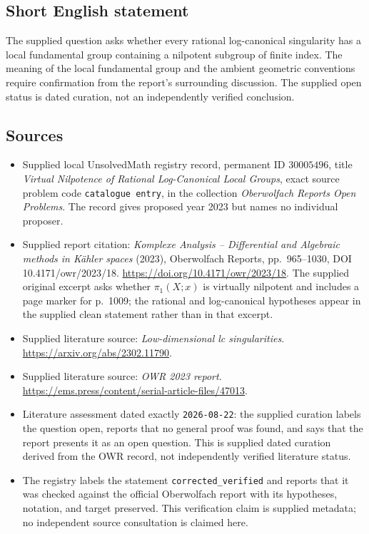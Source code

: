 \documentclass[11pt]{article}
\begin{document}
\subsection{Short English statement}
The supplied question asks whether every rational log-canonical singularity has a local fundamental group containing a nilpotent subgroup of finite index. The meaning of the local fundamental group and the ambient geometric conventions require confirmation from the report's surrounding discussion. The supplied open status is dated curation, not an independently verified conclusion.
\subsection{Sources}
\begin{itemize}
\item Supplied local UnsolvedMath registry record, permanent ID \(30005496\), title \emph{Virtual Nilpotence of Rational Log-Canonical Local Groups}, exact source problem code \texttt{catalogue entry}, in the collection \emph{Oberwolfach Reports Open Problems}. The record gives proposed year 2023 but names no individual proposer.
\item Supplied report citation: \emph{Komplexe Analysis -- Differential and Algebraic methods in Kähler spaces} (2023), Oberwolfach Reports, pp.~965--1030, DOI 10.4171/owr/2023/18. \url{https://doi.org/10.4171/owr/2023/18}. The supplied original excerpt asks whether \(\pi_1(X;x)\) is virtually nilpotent and includes a page marker for p.~1009; the rational and log-canonical hypotheses appear in the supplied clean statement rather than in that excerpt.
\item Supplied literature source: \emph{Low-dimensional lc singularities}. \url{https://arxiv.org/abs/2302.11790}.
\item Supplied literature source: \emph{OWR 2023 report}. \url{https://ems.press/content/serial-article-files/47013}.
\item Literature assessment dated exactly \texttt{2026-08-22}: the supplied curation labels the question open, reports that no general proof was found, and says that the report presents it as an open question. This is supplied dated curation derived from the OWR record, not independently verified literature status.
\item The registry labels the statement \texttt{corrected\_verified} and reports that it was checked against the official Oberwolfach report with its hypotheses, notation, and target preserved. This verification claim is supplied metadata; no independent source consultation is claimed here.
\end{itemize}
\end{document}
